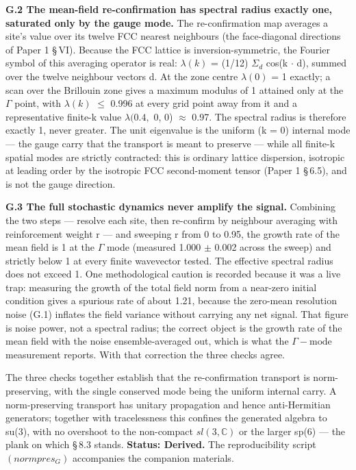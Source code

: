 \documentclass[11pt,oneside]{report}
\theoremstyle{definition}
\theoremstyle{remark}
\begin{document}
\textbf{G.2 The mean-field re-confirmation has spectral radius exactly
one, saturated only by the gauge mode.} The re-confirmation map averages
a site's value over its twelve FCC nearest neighbours (the face-diagonal
directions of Paper 1 \S\,VI). Because the FCC lattice is
inversion-symmetric, the Fourier symbol of this averaging operator is
real: \ensuremath{\lambda (k)} = (1/12) \ensuremath{\Sigma_{d}} cos(k \ensuremath{\cdot} d), summed over the twelve neighbour
vectors d. At the zone centre \ensuremath{\lambda (0)} = 1 exactly; a scan over the
Brillouin zone gives a maximum modulus of 1 attained only at the \ensuremath{\Gamma}
point, with \textbar \ensuremath{\lambda (k)}\textbar{} \ensuremath{\leq} 0.996 at every grid point away
from it and a representative finite-k value \ensuremath{\lambda (0.4,} 0, 0) \ensuremath{\approx} 0.97. The
spectral radius is therefore exactly 1, never greater. The unit
eigenvalue is the uniform (k = 0) internal mode --- the gauge carry that
the transport is meant to preserve --- while all finite-k spatial modes
are strictly contracted: this is ordinary lattice dispersion, isotropic
at leading order by the isotropic FCC second-moment tensor (Paper 1
\S\,6.5), and is not the gauge direction.

\textbf{G.3 The full stochastic dynamics never amplify the signal.}
Combining the two steps --- resolve each site, then re-confirm by
neighbour averaging with reinforcement weight r --- and sweeping r from
0 to 0.95, the growth rate of the mean field is 1 at the \ensuremath{\Gamma} mode
(measured 1.000 \ensuremath{\pm} 0.002 across the sweep) and strictly below 1 at every
finite wavevector tested. The effective spectral radius does not exceed
1. One methodological caution is recorded because it was a live trap:
measuring the growth of the total field norm from a near-zero initial
condition gives a spurious rate of about 1.21, because the zero-mean
resolution noise (G.1) inflates the field variance without carrying any
net signal. That figure is noise power, not a spectral radius; the
correct object is the growth rate of the mean field with the noise
ensemble-averaged out, which is what the \ensuremath{\Gamma -\text{mode}} measurement reports.
With that correction the three checks agree.

The three checks together establish that the re-confirmation transport
is norm-preserving, with the single conserved mode being the uniform
internal carry. A norm-preserving transport has unitary propagation and
hence anti-Hermitian generators; together with tracelessness this
confines the generated algebra to su(3), with no overshoot to the
non-compact \ensuremath{sl(3,\mathbb{C})} or the larger sp(6) --- the plank on which \S\,8.3
stands. \textbf{Status: Derived.} The reproducibility script
\ensuremath{(normpres_{G})} accompanies the companion materials.
\end{document}

